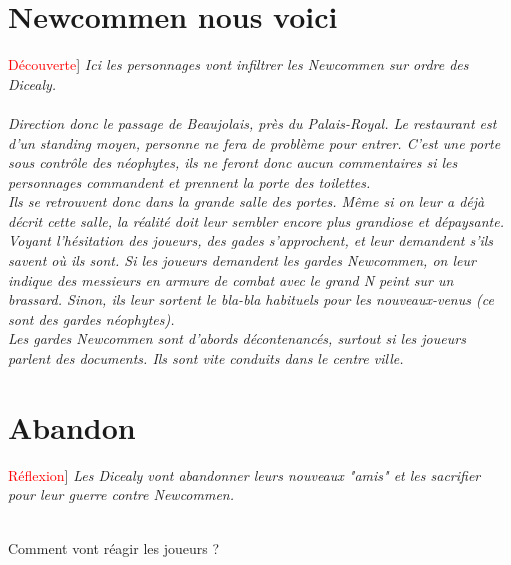 \documentclass[10pt,a4paper,twocolumn]{article}
\newenvironment{lAbstract}[1]{{[}\textcolor{red}{#1}{]}\itshape}{\\ \\}
\begin{document}
\section{Newcommen nous voici}
\begin{lAbstract}{Découverte}
Ici les personnages vont infiltrer les Newcommen sur ordre des Dicealy.
\end{lAbstract}
Direction donc le passage de Beaujolais, près du Palais-Royal. Le restaurant est d'un standing moyen, personne ne fera de problème pour entrer. C'est une porte sous contrôle des néophytes, ils ne feront donc aucun commentaires si les personnages commandent et prennent la porte des toilettes.
\\
Ils se retrouvent donc dans la grande salle des portes. Même si on leur a déjà décrit cette salle, la réalité doit leur sembler encore plus grandiose et dépaysante. \\
Voyant l'hésitation des joueurs, des gades s'approchent, et leur demandent s'ils savent où ils sont. Si les joueurs demandent les gardes Newcommen, on leur indique des messieurs en armure de combat avec le grand N peint sur un brassard. Sinon, ils leur sortent le bla-bla habituels pour les nouveaux-venus (ce sont des gardes néophytes).
\\
Les gardes Newcommen sont d'abords décontenancés, surtout si les joueurs parlent des documents. Ils sont vite conduits dans le centre ville.

\section{Abandon}
\begin{lAbstract}{Réflexion}
Les Dicealy vont abandonner leurs nouveaux "amis" et les sacrifier pour leur guerre contre Newcommen.
\end{lAbstract}

 Comment vont réagir les joueurs ?
\newpage
\end{document}
